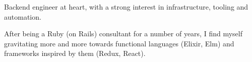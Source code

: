 

\begin{cvparagraph}

Backend engineer at heart, with a strong interest in infrastructure, tooling and
automation.

After being a Ruby (on Rails) consultant for a number of years, I find myself
gravitating more and more towards functional languages (Elixir, Elm) and
frameworks inspired by them (Redux, React).
\end{cvparagraph}
